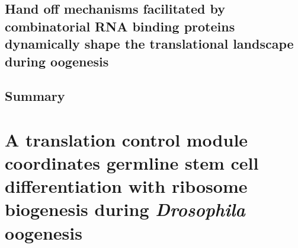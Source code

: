 \documentclass[12pt,oneside]{reedthesis}
\begin{document}
\hypertarget{hand-off-mechanisms-facilitated-by-combinatorial-rna-binding-proteins-dynamically-shape-the-translational-landscape-during-oogenesis}{%
\section{Hand off mechanisms facilitated by combinatorial RNA binding proteins dynamically shape the translational landscape during oogenesis}\label{hand-off-mechanisms-facilitated-by-combinatorial-rna-binding-proteins-dynamically-shape-the-translational-landscape-during-oogenesis}}

\hypertarget{summary}{%
\section{Summary}\label{summary}}


























































\hypertarget{a-translation-control-module-coordinates-germline-stem-cell-differentiation-with-ribosome-biogenesis-during-drosophila-oogenesis}{%
\chapter{\texorpdfstring{A translation control module coordinates germline stem cell differentiation with ribosome biogenesis during \emph{Drosophila} oogenesis}{A translation control module coordinates germline stem cell differentiation with ribosome biogenesis during Drosophila oogenesis}}\label{a-translation-control-module-coordinates-germline-stem-cell-differentiation-with-ribosome-biogenesis-during-drosophila-oogenesis}}
\end{document}
